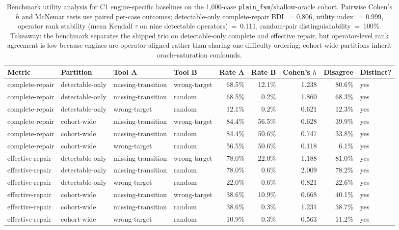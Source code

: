 \begin{table}[t]
\caption{Benchmark utility analysis for C1 engine-specific baselines on the 1{,}000-case \texttt{plain\_fsm}/shallow-oracle cohort. Pairwise Cohen's $h$ and McNemar tests use paired per-case outcomes; detectable-only complete-repair BDI~$=0.806$, utility index~$=0.999$, operator rank stability (mean Kendall $\tau$ on nine detectable operators)~=~0.111, random-pair distinguishability~=~100\%. Takeaway: the benchmark separates the shipped trio on detectable-only complete and effective repair, but operator-level rank agreement is low because engines are operator-aligned rather than sharing one difficulty ordering; cohort-wide partitions inherit oracle-saturation confounds.}
\label{tab:benchmark-utility}
\begin{tabular}{@{}llllrrrrl@{}}
\toprule
Metric & Partition & Tool A & Tool B & Rate A & Rate B & Cohen's $h$ & Disagree & Distinct? \\
\midrule
complete-repair & detectable-only & missing-transition & wrong-target & 68.5\% & 12.1\% & 1.238 & 80.6\% & yes \\
complete-repair & detectable-only & missing-transition & random & 68.5\% & 0.2\% & 1.860 & 68.3\% & yes \\
complete-repair & detectable-only & wrong-target & random & 12.1\% & 0.2\% & 0.621 & 12.3\% & yes \\
complete-repair & cohort-wide & missing-transition & wrong-target & 84.4\% & 56.5\% & 0.628 & 39.9\% & yes \\
complete-repair & cohort-wide & missing-transition & random & 84.4\% & 50.6\% & 0.747 & 33.8\% & yes \\
complete-repair & cohort-wide & wrong-target & random & 56.5\% & 50.6\% & 0.118 & 6.1\% & yes \\
effective-repair & detectable-only & missing-transition & wrong-target & 78.0\% & 22.0\% & 1.188 & 81.0\% & yes \\
effective-repair & detectable-only & missing-transition & random & 78.0\% & 0.6\% & 2.009 & 78.2\% & yes \\
effective-repair & detectable-only & wrong-target & random & 22.0\% & 0.6\% & 0.821 & 22.6\% & yes \\
effective-repair & cohort-wide & missing-transition & wrong-target & 38.6\% & 10.9\% & 0.668 & 40.1\% & yes \\
effective-repair & cohort-wide & missing-transition & random & 38.6\% & 0.3\% & 1.231 & 38.7\% & yes \\
effective-repair & cohort-wide & wrong-target & random & 10.9\% & 0.3\% & 0.563 & 11.2\% & yes \\
\bottomrule
\end{tabular}
\end{table}
